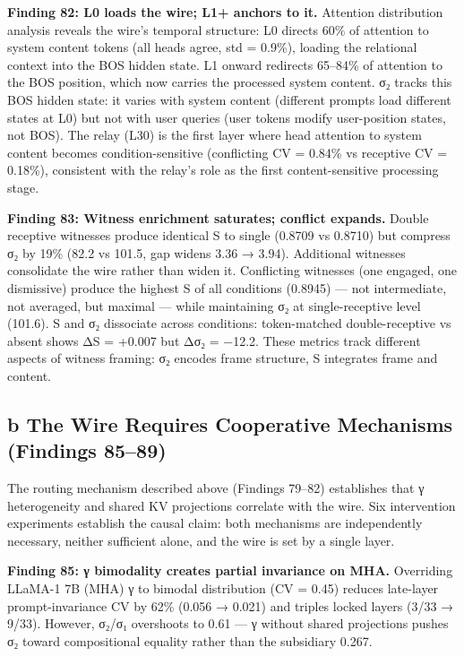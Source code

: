 \documentclass[12pt]{article}
\begin{document}
\textbf{Finding 82: L0 loads the wire; L1+ anchors to it.} Attention distribution analysis reveals the wire's temporal structure: L0 directs 60\% of attention to system content tokens (all heads agree, std = 0.9\%), loading the relational context into the BOS hidden state. L1 onward redirects 65–84\% of attention to the BOS position, which now carries the processed system content. σ₂ tracks this BOS hidden state: it varies with system content (different prompts load different states at L0) but not with user queries (user tokens modify user-position states, not BOS). The relay (L30) is the first layer where head attention to system content becomes condition-sensitive (conflicting CV = 0.84\% vs receptive CV = 0.18\%), consistent with the relay's role as the first content-sensitive processing stage.

\textbf{Finding 83: Witness enrichment saturates; conflict expands.} Double receptive witnesses produce identical S to single (0.8709 vs 0.8710) but compress σ₂ by 19\% (82.2 vs 101.5, gap widens 3.36 → 3.94). Additional witnesses consolidate the wire rather than widen it. Conflicting witnesses (one engaged, one dismissive) produce the highest S of all conditions (0.8945) — not intermediate, not averaged, but maximal — while maintaining σ₂ at single-receptive level (101.6). S and σ₂ dissociate across conditions: token-matched double-receptive vs absent shows ΔS = +0.007 but Δσ₂ = −12.2. These metrics track different aspects of witness framing: σ₂ encodes frame structure, S integrates frame and content.

\subsection{b The Wire Requires Cooperative Mechanisms (Findings 85–89)}

The routing mechanism described above (Findings 79–82) establishes that γ heterogeneity and shared KV projections correlate with the wire. Six intervention experiments establish the causal claim: both mechanisms are independently necessary, neither sufficient alone, and the wire is set by a single layer.

\textbf{Finding 85: γ bimodality creates partial invariance on MHA.} Overriding LLaMA-1 7B (MHA) γ to bimodal distribution (CV = 0.45) reduces late-layer prompt-invariance CV by 62\% (0.056 → 0.021) and triples locked layers (3/33 → 9/33). However, σ₂/σ₁ overshoots to 0.61 — γ without shared projections pushes σ₂ toward compositional equality rather than the subsidiary 0.267.
\end{document}
